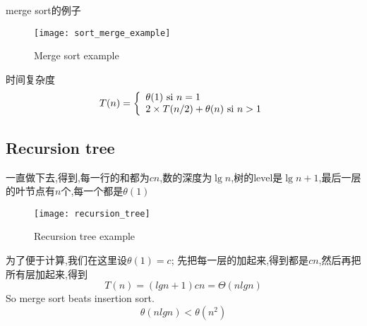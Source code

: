\documentclass{article}
\begin{document}
merge sort的例子
\begin{figure}[htbp]
  \centering
  \texttt{[image: sort\_merge\_example]}\\
  \caption{Merge sort example}\label{fig.sort.merge.example}
\end{figure}

时间复杂度
$$
T(n) =
\left\{
  \begin{array}{ll}
	\theta(1) \textrm{ si } n=1 \\
	2 \times T(n/2) + \theta(n) \textrm{ si } n>1
  \end{array}
\right.
$$

\subsection{Recursion tree}
一直做下去,得到,每一行的和都为$cn$,数的深度为$\lg n$,树的level是$\lg n+1$,最后一层的叶节点有$n$个,每一个都是$\theta(1)$

\begin{figure}[htbp]
  \centering
  \texttt{[image: recursion\_tree]}\\
  \caption{Recursion tree example}\label{fig.compute.recursion_tree}
\end{figure}

为了便于计算,我们在这里设$\theta(1)=c$;
先把每一层的加起来,得到都是$cn$,然后再把所有层加起来,得到
$$T(n)=(lgn+1)cn=\Theta(nlgn)$$
So merge sort beats insertion sort.
$$ \theta(nlgn)<\theta(n^2) $$
\end{document}
